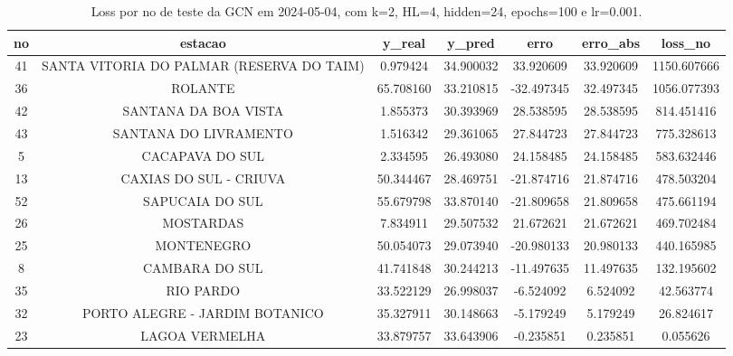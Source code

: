 \begin{table}[h]
\centering
\caption{Loss por no de teste da GCN em 2024-05-04, com k=2, HL=4, hidden=24, epochs=100 e lr=0.001.}
\label{tab:gcn_loss_k2_hl4_h24_e100_d20240504}
\begin{tabular}{ccccccc}
\toprule
no & estacao & y\_real & y\_pred & erro & erro\_abs & loss\_no \\
\midrule
41 & SANTA VITORIA DO PALMAR (RESERVA DO TAIM) & 0.979424 & 34.900032 & 33.920609 & 33.920609 & 1150.607666 \\
36 & ROLANTE & 65.708160 & 33.210815 & -32.497345 & 32.497345 & 1056.077393 \\
42 & SANTANA DA BOA VISTA & 1.855373 & 30.393969 & 28.538595 & 28.538595 & 814.451416 \\
43 & SANTANA DO LIVRAMENTO & 1.516342 & 29.361065 & 27.844723 & 27.844723 & 775.328613 \\
5 & CACAPAVA DO SUL & 2.334595 & 26.493080 & 24.158485 & 24.158485 & 583.632446 \\
13 & CAXIAS DO SUL - CRIUVA & 50.344467 & 28.469751 & -21.874716 & 21.874716 & 478.503204 \\
52 & SAPUCAIA DO SUL & 55.679798 & 33.870140 & -21.809658 & 21.809658 & 475.661194 \\
26 & MOSTARDAS & 7.834911 & 29.507532 & 21.672621 & 21.672621 & 469.702484 \\
25 & MONTENEGRO & 50.054073 & 29.073940 & -20.980133 & 20.980133 & 440.165985 \\
8 & CAMBARA DO SUL & 41.741848 & 30.244213 & -11.497635 & 11.497635 & 132.195602 \\
35 & RIO PARDO & 33.522129 & 26.998037 & -6.524092 & 6.524092 & 42.563774 \\
32 & PORTO ALEGRE - JARDIM BOTANICO & 35.327911 & 30.148663 & -5.179249 & 5.179249 & 26.824617 \\
23 & LAGOA VERMELHA & 33.879757 & 33.643906 & -0.235851 & 0.235851 & 0.055626 \\
\bottomrule
\end{tabular}
\end{table}
